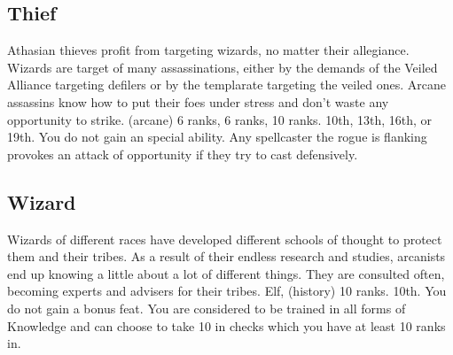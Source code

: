 \subsection{Thief}
Athasian thieves profit from targeting wizards, no matter their allegiance.
{Wizards are target of many assassinations, either by the demands of the Veiled Alliance targeting defilers or by the templarate targeting the veiled ones. Arcane assassins know how to put their foes under stress and don't waste any opportunity to strike.}
{ (arcane) 6 ranks,  6 ranks,  10 ranks.}
{10th, 13th, 16th, or 19th.}
{You do not gain an special ability.}
{
	Any spellcaster the rogue is flanking provokes an attack of opportunity if they try to cast defensively.
}

\subsection{Wizard}
Wizards of different races have developed different schools of thought to protect them and their tribes.
{As a result of their endless research and studies, arcanists end up knowing a little about a lot of different things. They are consulted often, becoming experts and advisers for their tribes.}
{Elf,  (history) 10 ranks.}
{10th.}
{You do not gain a bonus feat.}
{
	You are considered to be trained in all forms of Knowledge and can choose to take 10 in  checks which you have at least 10 ranks in.
}

